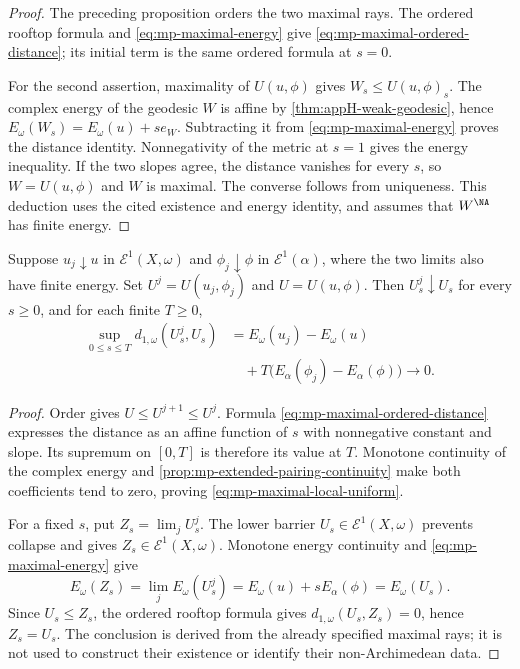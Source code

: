 \begin{proof}
The preceding proposition orders the two maximal rays. The ordered rooftop formula and \eqref{eq:mp-maximal-energy} give \eqref{eq:mp-maximal-ordered-distance}; its initial term is the same ordered formula at $s=0$.

For the second assertion, maximality of $U(u,\phi)$ gives $W_s\leq U(u,\phi)_s$. The complex energy of the geodesic $W$ is affine by \cref{thm:appH-weak-geodesic}, hence $E_\omega(W_s)=E_\omega(u)+se_W$. Subtracting it from \eqref{eq:mp-maximal-energy} proves the distance identity. Nonnegativity of the metric at $s=1$ gives the energy inequality. If the two slopes agree, the distance vanishes for every $s$, so $W=U(u,\phi)$ and $W$ is maximal. The converse follows from uniqueness. This deduction uses the cited existence and energy identity, and assumes that $W^{\NA}$ has finite energy.
\end{proof}

\begin{corollary}\label{cor:mp-maximal-decreasing-stability}
Suppose $u_j\downarrow u$ in $\mathcal E^1(X,\omega)$ and $\phi_j\downarrow\phi$ in $\mathcal E^1(\alpha)$, where the two limits also have finite energy. Set $U^j=U(u_j,\phi_j)$ and $U=U(u,\phi)$. Then $U^j_s\downarrow U_s$ for every $s\geq0$, and for each finite $T\geq0$,
\[
 \begin{split}
 \sup_{0\leq s\leq T}d_{1,\omega}(U^j_s,U_s)
   &=E_\omega(u_j)-E_\omega(u)\\
   &\quad+T\bigl(E_\alpha(\phi_j)-E_\alpha(\phi)\bigr)
   \longrightarrow0.
 \end{split}
\tag{60.23h}\label{eq:mp-maximal-local-uniform}
\]
\end{corollary}

\begin{proof}
Order gives $U\leq U^{j+1}\leq U^j$. Formula \eqref{eq:mp-maximal-ordered-distance} expresses the distance as an affine function of $s$ with nonnegative constant and slope. Its supremum on $[0,T]$ is therefore its value at $T$. Monotone continuity of the complex energy and \cref{prop:mp-extended-pairing-continuity} make both coefficients tend to zero, proving \eqref{eq:mp-maximal-local-uniform}.

For a fixed $s$, put $Z_s=\lim_jU^j_s$. The lower barrier $U_s\in\mathcal E^1(X,\omega)$ prevents collapse and gives $Z_s\in\mathcal E^1(X,\omega)$. Monotone energy continuity and \eqref{eq:mp-maximal-energy} give
\[
 E_\omega(Z_s)=\lim_jE_\omega(U^j_s)
             =E_\omega(u)+sE_\alpha(\phi)=E_\omega(U_s).
\]
Since $U_s\leq Z_s$, the ordered rooftop formula gives $d_{1,\omega}(U_s,Z_s)=0$, hence $Z_s=U_s$. The conclusion is derived from the already specified maximal rays; it is not used to construct their existence or identify their non-Archimedean data.
\end{proof}

